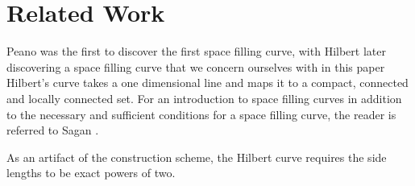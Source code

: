 \section{Related Work}

Peano was the first to discover the first space filling curve, with Hilbert later discovering
a space filling curve that we concern ourselves with in this paper \cite{hilbert2004david}
Hilbert's curve takes a one dimensional line and maps it to a compact, connected and locally connected
set.
For an introduction to space filling curves in addition to the necessary and sufficient
conditions for a space filling curve, the reader is referred to Sagan \cite{sagan_1994}.

As an artifact of the construction scheme, the Hilbert curve requires the side lengths to be exact powers of two.


%
%
%
%
%
%
%
%
%
%
%
%
%
%
%
